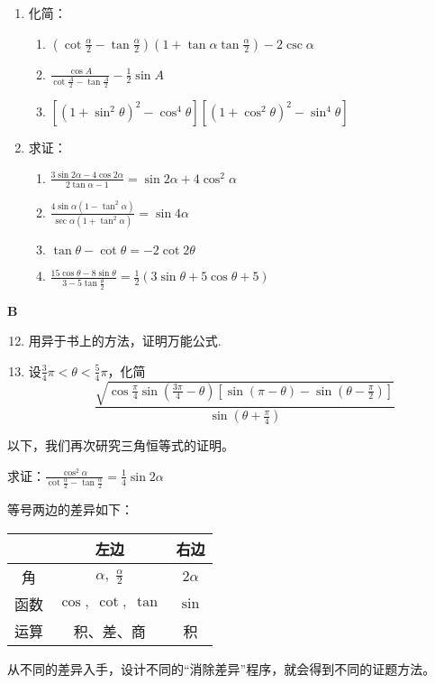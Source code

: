 \begin{enumerate}
\item 化简：
\begin{enumerate}[(1)]
    \item $\left(\cot\frac{\alpha}{2}-\tan\frac{\alpha}{2}\right)\left(1+\tan\alpha\tan\frac{\alpha}{2}\right)-2\csc\alpha$
    \item $\frac{\cos A}{\cot\frac{A}{2}-\tan\frac{A}{2}}-\frac{1}{2}\sin A$
    \item $[(1+\sin^2\theta)^2-\cos^4\theta][(1+\cos^2\theta)^2-\sin^4\theta]$
\end{enumerate}

\item 求证：
\begin{enumerate}[(1)]
    \item $\frac{3\sin2\alpha-4\cos2\alpha}{2\tan\alpha-1}=\sin2\alpha+4\cos^2\alpha$
    \item $\frac{4\sin\alpha(1-\tan^2\alpha)}{\sec\alpha(1+\tan^2\alpha)}=\sin4\alpha$
    \item $\tan\theta-\cot\theta=-2\cot2\theta$
    \item $\frac{15\cos\theta-8\sin\theta}{3-5\tan\frac{\theta}{2}}=\frac{1}{2}(3\sin\theta+5\cos\theta+5)$
\end{enumerate}
\end{enumerate}

\begin{center}
    \bfseries B
\end{center}

\begin{enumerate}\setcounter{enumi}{11}
    \item 用异于书上的方法，证明万能公式.
    \item 设$\frac{3}{4}\pi<\theta<\frac{5}{4}\pi$，化简
\[\frac{\sqrt{\cos\frac{\pi}{4}\sin\left(\frac{3\pi}{4}-\theta\right)\left[\sin(\pi-\theta)-\sin\left(\theta-\frac{\pi}{2}\right)\right]}}{\sin\left(\theta+\frac{\pi}{4}\right)}\]
\end{enumerate}

以下，我们再次研究三角恒等式的证明。
\begin{example}
求证：$\frac{\cos^2\alpha}{\cot\frac{\alpha}{2}-\tan\frac{\alpha}{2}}=\frac{1}{4}\sin 2\alpha$
\end{example}

\begin{analyze}
    等号两边的差异如下：
\begin{center}
    \begin{tabular}{c|cc}
\hline
& 左边& 右边\\
\hline
角&$\alpha,\; \frac{\alpha}{2}$ & $2\alpha$\\[1.5ex]
函数&$\cos,\; \cot ,\; \tan$ & $\sin$\\
运算&积、差、商 & 积\\
\hline
    \end{tabular}
\end{center}
从不同的差异入手，设计不同的“消除差异”程序，就会得到不同的证题方法。
\end{analyze}

